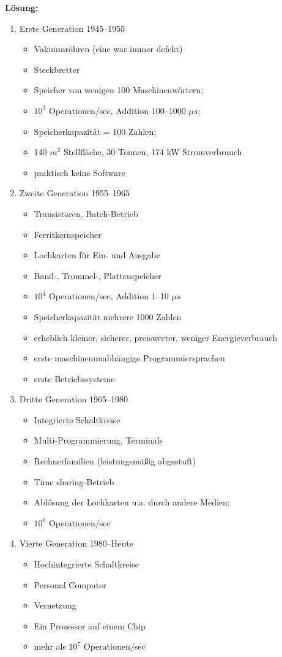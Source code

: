\documentclass[11pt,a4paper,DIV=12]{scrartcl}
\newcommand{\loesung}{\textbf{Lösung:}\\}
\begin{document}
\loesung
\begin{enumerate}
  \item Erste Generation 1945--1955
    \begin{itemize}
      \item Vakuumröhren (eine war immer defekt)
      \item Steckbretter
      \item Speicher von wenigen 100 Maschinenwörtern;
      \item $10^3$ Operationen/sec, Addition 100--1000 $\mu s$;
      \item Speicherkapazität = 100 Zahlen;
      \item 140 $m^2$ Stellfläche, 30 Tonnen, 174 kW Stromverbrauch
      \item praktisch keine Software
    \end{itemize}
  \item Zweite Generation 1955--1965
    \begin{itemize}
      \item Transistoren, Batch-Betrieb
      \item Ferritkernspeicher
      \item Lochkarten für Ein- und Ausgabe
      \item Band-, Trommel-, Plattenspeicher
      \item $10^4$ Operationen/sec, Addition 1--10 $\mu s$
      \item Speicherkapazität mehrere 1000 Zahlen
      \item erheblich kleiner, sicherer, preiswerter, weniger Energieverbrauch
      \item erste maschinenunabhängige Programmiersprachen
      \item erste Betriebssysteme
    \end{itemize}
  \item Dritte Generation 1965--1980
    \begin{itemize}
      \item Integrierte Schaltkreise
      \item Multi-Programmierung, Terminals
      \item Rechnerfamilien (leistungsmäßig abgestuft)
      \item Time sharing-Betrieb
      \item Ablösung der Lochkarten u.a. durch andere Medien;
      \item $10^6$ Operationen/sec
    \end{itemize}
  \item Vierte Generation 1980--Heute
    \begin{itemize}
      \item Hochintegrierte Schaltkreise
      \item Personal Computer
      \item Vernetzung
      \item Ein Prozessor auf einem Chip
      \item mehr als $10^7$ Operationen/sec
    \end{itemize}
\end{enumerate}
\end{document}
